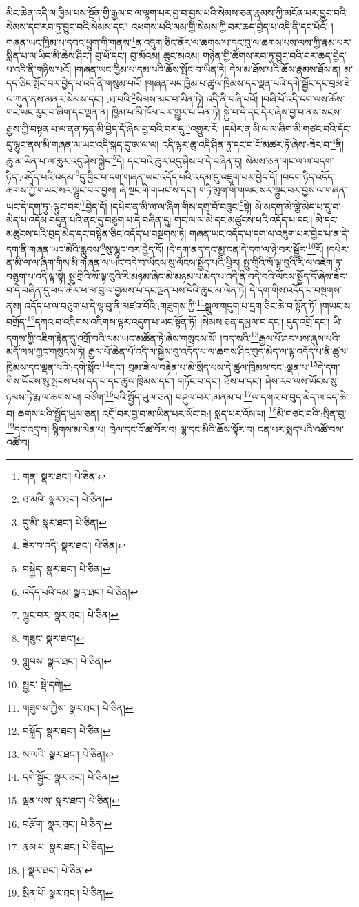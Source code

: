 མིང་ཆེན་འདི་ལ་ཁྱིམ་པས་སྔོན་གྱི་རྒྱལ་བ་ལ་ལྷག་པར་བྱ་བ་བྱས་པའི་སེམས་ཅན་རྣམས་ཀྱི་མངོན་པར་བྱུང་བའི་སེམས་དང་རབ་ཏུ་བྱུང་བའི་སེམས་དང་། འཕགས་པའི་ལམ་གྱི་སེམས་ཀྱི་བར་ཆད་བྱེད་པ་འདི་ནི་དང་པོའོ། །གཞན་ཡང་ཁྱིམ་པ་དབང་ཕྱུག་གི་གནས་\footnote{གན་  སྣར་ཐང་།  པེ་ཅིན། }ན་འདུག་ཅིང་ནོར་ལ་ཆགས་པ་དང་བུ་ལ་ཆགས་པས་ལས་ཀྱི་རྣམ་པར་སྨིན་པ་ལ་ཡིད་མི་ཆེས་ཤིང་། བུ་ཕོ་དང་། བུ་མོའམ། ཆུང་མའམ། གཉེན་གྱི་ཚོགས་རབ་ཏུ་བྱུང་བའི་བར་ཆད་བྱེད་པ་འདི་ནི་གཉིས་པའོ། །གཞན་ཡང་ཁྱིམ་པ་དམ་པའི་ཆོས་སྤོང་བ་ཡིན་ཏེ། དེས་མ་ཐོས་པའི་ཆོས་རྣམས་ཐོས་ན། མ་དད་ཅིང་སྤོང་བར་བྱེད་པ་འདི་ནི་གསུམ་པའོ། །གཞན་ཡང་ཁྱིམ་པ་ཚུལ་ཁྲིམས་དང་ལྡན་པའི་དགེ་སྦྱོང་དང་བྲམ་ཟེ་ལ་ཀུན་ནས་མནར་སེམས་དང་། :ཐ་བའི་\footnote{ཐ་མའི་  སྣར་ཐང་།  པེ་ཅིན། }སེམས་མང་བ་ཡིན་ཏེ། འདི་ནི་བཞི་པའོ། །བཞི་པོ་འདི་དག་ལས་ཆོས་གང་ཡང་རུང་བ་ཞིག་དང་ལྡན་ན། ཁྱིམ་པ་མི་ཁོམ་པར་གྱུར་པ་ཡིན་ཏེ། སྐྱེ་བ་དེ་དང་དེར་ཞེས་བྱ་བ་ནས་སངས་རྒྱས་ཀྱི་བསྟན་པ་ལ་ནན་ཏན་མི་བྱེད་དོ་ཞེས་བྱ་བའི་བར་དུ་\footnote{དུ་མི་  སྣར་ཐང་།  པེ་ཅིན། }འགྱུར་རོ། །དཔེར་ན་མི་ལ་ལ་ཞིག་མི་གཙང་བའི་དོང་དུ་ལྷུང་ནས་མི་གཞན་ལ་ཡང་འདི་སྐད་དུ་ཨ་ལ་ལ། འདི་ལྟར་ཆུ་འདི་ཤིན་ཏུ་དང་བ་ངོ་མཚར་ཏོ་ཞེས་:ཟེར་བ་\footnote{ཟེར་བ་འདི་  སྣར་ཐང་།  པེ་ཅིན། }ནི། ཆུ་མ་ཡིན་པ་ལ་ཆུར་འདུ་ཤེས་སྐྱེད་\footnote{བསྐྱེད་  སྣར་ཐང་།  པེ་ཅིན། }དེ། དང་བའི་ཆུར་འདུ་ཤེས་པ་དེ་བཞིན་དུ། སེམས་ཅན་གང་ལ་ལ་བདག་ཉིད་:འདོད་པའི་འདམ་\footnote{འདོད་པའི་དམ་  སྣར་ཐང་།  པེ་ཅིན། }དུ་བྱིང་བ་དག་གཞན་ཡང་འདོད་པའི་འདམ་དུ་འཇུག་པར་བྱེད་དོ། །བདག་ཉིད་འདོད་ཆགས་ཀྱི་གཡང་སར་ལྷུང་བར་བྱས། ཞེ་སྡང་གི་གཡང་ས་དང་། གཏི་མུག་གི་གཡང་སར་ལྷུང་བར་བྱས་ལ་གཞན་ཡང་དེ་དག་ཏུ་:ལྟུང་བར་\footnote{ལྷུང་བར་  སྣར་ཐང་།  པེ་ཅིན། }བྱེད་དོ། །དཔེར་ན་མི་ལ་ལ་ཞིག་གིས་དགྲ་བོ་བཟུང་\footnote{གཟུང་  སྣར་ཐང་། }སྟེ། མེ་མདག་མེ་ལྕེ་མེད་པ་དུ་བ་མེད་པ་འདོམ་བདུན་པའི་ནང་དུ་བཅུག་པ་དེ་བཞིན་དུ། གང་ལ་ལ་མེ་དང་མཚུངས་པའི་འདོད་པ་དང་། མེ་དང་མཚུངས་པའི་བུད་མེད་དང་བསྟེན་ཅིང་འདོད་པ་བསྔགས་ཏེ། གཞན་ཡང་འདོད་པ་དག་ལ་འཇུག་པར་བྱེད་པ་ན་དེ་དག་ནི་གཞན་ཡང་མེའི་རླུབས་\footnote{གླུབས་  སྣར་ཐང་།  པེ་ཅིན། }སུ་ལྷུང་བར་བྱེད་དོ། །དེ་དག་ནད་དང་མྱ་ངན་དེ་དག་ལ་ཉེ་བར་སྦྱོར་\footnote{སྦྱར་  སྡེ་དགེ། }རོ། །དཔེར་ན་མི་ལ་ལ་ཞིག་གིས་མི་གཞན་ལ་ཡང་བདེ་བ་ཡོངས་སུ་ལོངས་སྤྱོད་པའི་ཕྱིར། སྤུ་གྲིའི་སོ་ལྟ་བུའི་རི་ལ་འཛེག་ཏུ་བཅུག་པ་འདི་ལྟ་སྟེ། སྤུ་གྲིའི་སོ་ལྟ་བུའི་རི་མཉམ་ཞིང་མི་མཉམ་པ་མེད་པ་འདི་ནི་བདེ་བའི་ལོངས་སྤྱོད་དོ་ཞེས་ཟེར་བ་དེ་བཞིན་དུ་ཕལ་ཆེར་ཕ་མ་བུ་ལ་བྱམས་པ་དང་ལྡན་པས་དེའི་ཆུང་མ་ལེན་ཏེ། དེ་དག་གིས་འདོད་པ་བསྔགས་ནས། འདོད་པ་ལ་བཅུག་པ་དེ་ལྟ་བུ་ནི་མཛའ་བོའི་:གཟུགས་ཀྱི་\footnote{གཟུགས་ཀྱིས་  སྣར་ཐང་།  པེ་ཅིན། }སྦྲུལ་གདུག་པ་དྲག་ཅིང་ཆེ་བ་སྟོན་ཏོ། །གཡང་ས་བགྲོད་\footnote{བསྒྲོད་  སྣར་ཐང་།  པེ་ཅིན། }དཀའ་བ་འཇིགས་འཇིགས་ལྟར་འདུག་པ་ཡང་སྟོན་ཏོ། །སེམས་ཅན་དམྱལ་བ་དང་། དུད་འགྲོ་དང་། ཡི་དགས་ཀྱི་འཇིག་རྟེན་དུ་འགྲོ་བའི་ལམ་ཡང་མཚོན་ཏེ་ཞེས་གསུངས་སོ། །བད་སའི་\footnote{ས་ལའི་  སྣར་ཐང་།  པེ་ཅིན། }རྒྱལ་པོ་ཤར་པས་ཞུས་པའི་མདོ་ལས་ཀྱང་གསུངས་ཏེ། རྒྱལ་པོ་ཆེན་པོ་འདི་ལ་སྐྱེས་བུ་འདོད་པ་ལ་ཆགས་ཤིང་བུད་མེད་ལ་ལྟ་འདོད་པ་ནི་ཚུལ་ཁྲིམས་དང་ལྡན་པའི་:དགེ་སློང་\footnote{དགེ་སྦྱོང་  སྣར་ཐང་།  པེ་ཅིན། }དང་། བྲམ་ཟེ་ལ་བརྟེན་པ་མི་སྲིད་པས་དེ་ཚུལ་ཁྲིམས་དང་:ལྡན་པ་\footnote{ལྡན་པས་  སྣར་ཐང་།  པེ་ཅིན། }དེ་དག་གིས་ཡོངས་སུ་སྤངས་པས་དད་པ་དང་ཚུལ་ཁྲིམས་དང་། གཏོང་བ་དང་། ཐོས་པ་དང་། ཤེས་རབ་ལས་ཡོངས་སུ་ཉམས་ཏེ་རྨ་ལ་ཆགས་པ། བཙོག་\footnote{བརྩོག་  སྣར་ཐང་།  པེ་ཅིན། }པའི་སྤྱོད་ཡུལ་ཅན། བཤུལ་བར་:མནམ་པ་\footnote{རྣམ་པ་  སྣར་ཐང་།  པེ་ཅིན། }ལ་དགའ་བ་བུད་མེད་ལ་དད་ཆེ་བ། ཆགས་པའི་སྤྱོད་ཡུལ་ཅན། འགྲོ་བར་བྱ་བ་མ་ཡིན་པར་སོང་བ:། སྨད་པར་འོས་པ། \footnote{།    སྣར་ཐང་།  པེ་ཅིན། }མི་གཙང་བའི་:སྲིན་བུ་\footnote{སྲིན་པོ་  སྣར་ཐང་།  པེ་ཅིན། }དང་འདྲ་བ། སྙིགས་མ་ལེན་པ། ཁྲེལ་དང་ངོ་ཚ་བོར་བ། ལྷ་དང་མིའི་ཆོས་སྟོར་བ། ངན་པར་སྨད་པའི་འཚོ་བས་འཚོ་བ། 